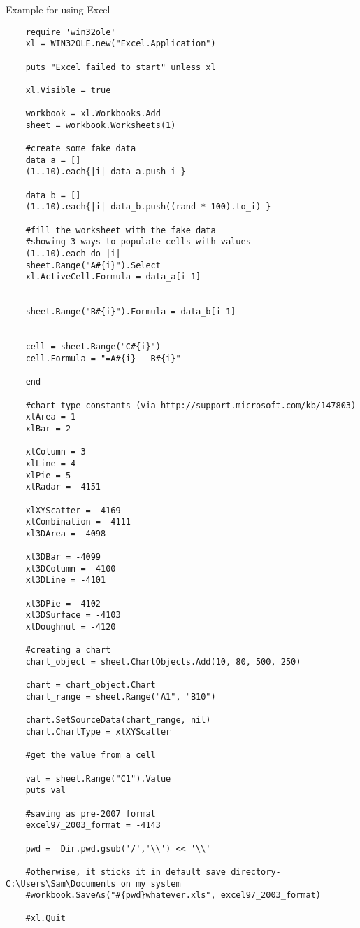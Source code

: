 	
	\vpara
	Example for using Excel
	
	\begin{lstlisting}
	require 'win32ole'
	xl = WIN32OLE.new("Excel.Application")
	
	puts "Excel failed to start" unless xl
	
	xl.Visible = true
	
	workbook = xl.Workbooks.Add
	sheet = workbook.Worksheets(1)
	
	#create some fake data
	data_a = []
	(1..10).each{|i| data_a.push i }
	
	data_b = []
	(1..10).each{|i| data_b.push((rand * 100).to_i) }
	
	#fill the worksheet with the fake data
	#showing 3 ways to populate cells with values
	(1..10).each do |i|
	sheet.Range("A#{i}").Select
	xl.ActiveCell.Formula = data_a[i-1]
	
	
	sheet.Range("B#{i}").Formula = data_b[i-1]
	
	
	cell = sheet.Range("C#{i}")
	cell.Formula = "=A#{i} - B#{i}"
	
	end 
	
	#chart type constants (via http://support.microsoft.com/kb/147803)
	xlArea = 1
	xlBar = 2
	
	xlColumn = 3
	xlLine = 4
	xlPie = 5
	xlRadar = -4151
	
	xlXYScatter = -4169
	xlCombination = -4111
	xl3DArea = -4098
	
	xl3DBar = -4099
	xl3DColumn = -4100
	xl3DLine = -4101 
	
	xl3DPie = -4102
	xl3DSurface = -4103
	xlDoughnut = -4120
	
	#creating a chart 
	chart_object = sheet.ChartObjects.Add(10, 80, 500, 250)
	
	chart = chart_object.Chart
	chart_range = sheet.Range("A1", "B10")
	
	chart.SetSourceData(chart_range, nil)
	chart.ChartType = xlXYScatter
	
	#get the value from a cell
	
	val = sheet.Range("C1").Value
	puts val
	
	#saving as pre-2007 format
	excel97_2003_format = -4143 
	
	pwd =  Dir.pwd.gsub('/','\\') << '\\'
	
	#otherwise, it sticks it in default save directory- C:\Users\Sam\Documents on my system
	#workbook.SaveAs("#{pwd}whatever.xls", excel97_2003_format)
	
	#xl.Quit
	\end{lstlisting}
	
